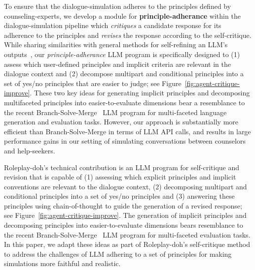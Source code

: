 To ensure that the dialogue-simulation adheres to the principles defined by counseling-experts, we develop a module for \textbf{principle-adherance} within the dialogue-simulation pipeline which \textit{critiques} a candidate response for its adherence to the principles and \textit{revises} the response according to the self-critique. While sharing similarities with general methods for self-refining an LLM's outputs~\cite{madaan2023selfrefine}, our \textit{principle-adherance} LLM program is specifically designed to (1) assess which user-defined principles and implicit criteria are relevant in the dialogue context and (2) decompose multipart and conditional principles into a set of yes/no principles that are easier to judge; see Figure~\ref{fig:agent-critique-improve}. These two key ideas for generating implicit principles and decomposing multifaceted principles into easier-to-evaluate dimensions bear a resemblance to the recent Branch-Solve-Merge~\cite{saha2023branchsolvemerge} LLM program for multi-faceted language generation and evaluation tasks. However, our approach is substantially more efficient than Branch-Solve-Merge in terms of LLM API calls, and results in large performance gains in our setting of simulating conversations between counselors and help-seekers.



Roleplay-doh's technical contribution is an LLM program for self-critique and revision that is capable of (1) assessing which explicit principles and implicit conventions are relevant to the dialogue context, (2) decomposing multipart and conditional principles into a set of yes/no principles and (3) answering these principles using chain-of-thought to guide the generation of a revised response; see Figure~\ref{fig:agent-critique-improve}. The generation of implicit principles and decomposing principles into easier-to-evaluate dimensions bears resemblance to the recent Branch-Solve-Merge~\cite{saha2023branchsolvemerge} LLM program for multi-faceted evaluation tasks. In this paper, we adapt these ideas as part of Roleplay-doh's self-critique method to address the challenges of LLM adhering to a set of principles for making simulations more faithful and realistic. 
\fi 

